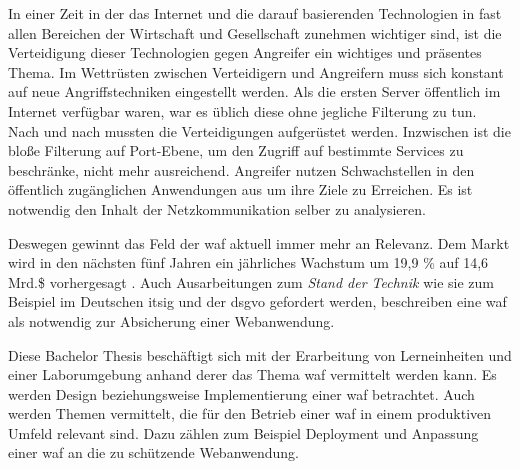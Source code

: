 \label{sec:introuduction}

In einer Zeit in der das Internet und die darauf basierenden Technologien in fast allen Bereichen der Wirtschaft und Gesellschaft zunehmen wichtiger sind, ist die Verteidigung dieser Technologien gegen Angreifer ein wichtiges und präsentes Thema.
Im Wettrüsten zwischen Verteidigern und Angreifern muss sich konstant auf neue Angriffstechniken eingestellt werden.
Als die ersten Server öffentlich im Internet verfügbar waren, war es üblich diese ohne jegliche Filterung zu tun.
Nach und nach mussten die Verteidigungen aufgerüstet werden.
Inzwischen ist die bloße Filterung auf Port-Ebene, um den Zugriff auf bestimmte Services zu beschränke, nicht mehr ausreichend.
Angreifer nutzen Schwachstellen in den öffentlich zugänglichen Anwendungen aus um ihre Ziele zu Erreichen.
Es ist notwendig den Inhalt der Netzkommunikation selber zu analysieren.


Deswegen gewinnt das Feld der \ac{waf} aktuell immer mehr an Relevanz.
Dem Markt wird in den nächsten fünf Jahren ein jährliches Wachstum um 19,9 \% auf 14,6 Mrd.\$ vorhergesagt \cite{WebApplicationFirewall}.
Auch Ausarbeitungen zum \textit{Stand der Technik} wie sie zum Beispiel im Deutschen \ac{itsig} und der \ac{dsgvo} gefordert werden, beschreiben eine \ac{waf} als notwendig zur Absicherung einer Webanwendung\cite[3.1.19 Schutz von Webanwendungen]{StandTechnik}.


Diese Bachelor Thesis beschäftigt sich mit der Erarbeitung von Lerneinheiten und einer Laborumgebung anhand derer das Thema \ac{waf} vermittelt werden kann.
Es werden Design beziehungsweise Implementierung einer \ac{waf} betrachtet.
Auch werden Themen vermittelt, die für den Betrieb einer \ac{waf} in einem produktiven Umfeld relevant sind.
Dazu zählen zum Beispiel Deployment und Anpassung einer \ac{waf} an die zu schützende Webanwendung.


\pagebreak